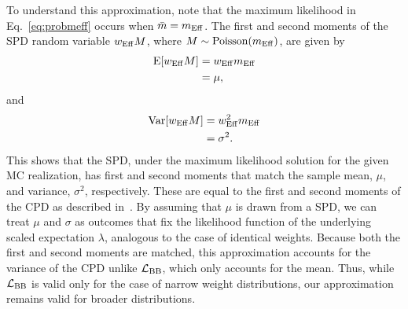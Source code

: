 To understand this approximation, note that the maximum likelihood in Eq.~\eqref{eq:probmeff} occurs when $\bar m = m_\mathrm{Eff}$. The first and second moments of the SPD random variable $w_\mathrm{Eff} M$, where $M \sim \mathrm{Poisson}(m_\mathrm{Eff})$, are given by
\begin{align}
\mathrm{E}[w_\mathrm{Eff} M] &= w_\mathrm{Eff} m_\mathrm{Eff} \\
&= \mu, \nonumber
\end{align}
and 
\begin{align}
\mathrm{Var}[w_\mathrm{Eff} M] &= w_\mathrm{Eff}^2 m_\mathrm{Eff} \\
&= \sigma^2. \nonumber
\end{align}
This shows that the SPD, under the maximum likelihood solution for the given MC realization, has first and second moments that match the sample mean, $\mu$, and variance, $\sigma^2$, respectively. These are equal to the first and second moments of the CPD as described in~\cite{Bohm:2013gla}. By assuming that $\mu$ is drawn from a SPD, we can treat $\mu$ and $\sigma$ as outcomes that fix the likelihood function of the underlying scaled expectation $\lambda$, analogous to the case of identical weights. Because both the first and second moments are matched, this approximation accounts for the variance of the CPD unlike $\mathcal{L}_{\textmd{BB}}$, which only accounts for the mean. Thus, while $\mathcal{L}_{\textmd{BB}}$ is valid only for the case of narrow weight distributions, our approximation remains valid for broader distributions.


